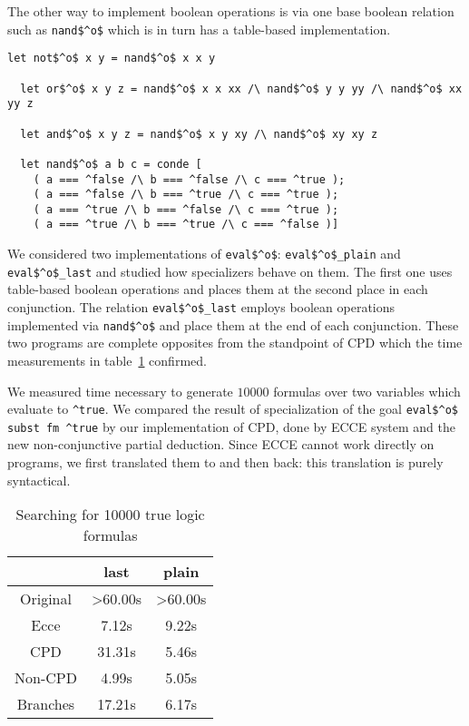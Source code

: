 The other way to implement boolean operations is via one base boolean relation such as \lstinline{nand$^o$} which is in turn has a table-based implementation.

\begin{lstlisting}[label={not:table}, caption={Implementation of boolean operation via \lstinline{nand}}, captionpos=b]
  let not$^o$ x y = nand$^o$ x x y

  let or$^o$ x y z = nand$^o$ x x xx /\ nand$^o$ y y yy /\ nand$^o$ xx yy z

  let and$^o$ x y z = nand$^o$ x y xy /\ nand$^o$ xy xy z

  let nand$^o$ a b c = conde [
    ( a === ^false /\ b === ^false /\ c === ^true );
    ( a === ^false /\ b === ^true /\ c === ^true );
    ( a === ^true /\ b === ^false /\ c === ^true );
    ( a === ^true /\ b === ^true /\ c === ^false )]
\end{lstlisting}

We considered two implementations of \lstinline{eval$^o$}: \lstinline{eval$^o$_plain} and \lstinline{eval$^o$_last} and studied how specializers behave on them.
The first one uses table-based boolean operations and places them at the second place in each conjunction.
The relation \lstinline{eval$^o$_last} employs boolean operations implemented via \lstinline{nand$^o$} and place them at the end of each conjunction.
These two programs are complete opposites from the standpoint of CPD which the time measurements in table~\ref{tbl:eval} confirmed.

We measured time necessary to generate $10000$ formulas over two variables which evaluate to \lstinline{^true}.
We compared the result of specialization of the goal \lstinline{eval$^o$ subst fm ^true} by our implementation of CPD, done by ECCE system and the new non-conjunctive partial deduction.
Since ECCE cannot work directly on \mk{} programs, we first translated them to \pro{} and then back: this translation is purely syntactical.

\begin{table}
  \centering
  \begin{tabular}{c|c|c}
                   & last & plain \\
  \hline\hline
  Original         & >60.00s & >60.00s \\
  \hline
  Ecce             & 7.12s  & 9.22s \\
  \hline
  CPD              & 31.31s & 5.46s \\
  \hline
  Non-CPD          & 4.99s  & 5.05s \\
  \hline
  Branches         & 17.21s  & 6.17s \\
  \hline
  \end{tabular}

  \caption{Searching for 10000 true logic formulas}
  \label{tbl:eval}
\end{table}

